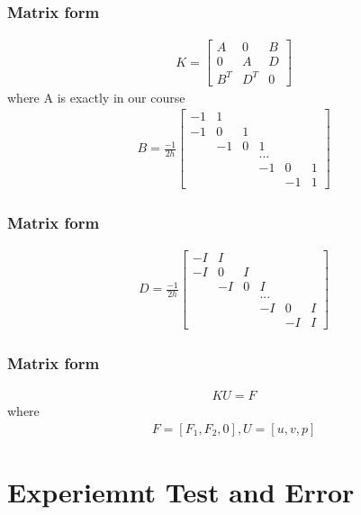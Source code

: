 \documentclass[11pt]{beamer}
\numberwithin{equation}{section}
\theoremstyle{plain}
\theoremstyle{definition}
\theoremstyle{remark}
\begin{document}
\begin{frame}\frametitle{Matrix form}
\begin{align*}
K=\begin{bmatrix}
A & 0 & B\\ 
0 & A & D\\ 
B^T & D^T & 0 
\end{bmatrix}
\end{align*}  
where A is exactly in our course 
\begin{align*}
B=\frac{-1}{2h} \begin{bmatrix}
-1 & 1 &  &  &  & \\ 
-1 & 0 & 1 &  &  & \\ 
 & -1 & 0 & 1 &  & \\ 
 &  &  & ... &  & \\ 
 &  &  & -1 & 0 & 1\\ 
 &  &  &  & -1 & 1
\end{bmatrix}
\end{align*}
\end{frame}

\begin{frame}\frametitle{Matrix form}
\begin{align*}
D=\frac{-1}{2h} \begin{bmatrix}
-I & I &  &  &  & \\ 
-I & 0 & I &  &  & \\ 
 & -I & 0 & I &  & \\ 
 &  &  & ... &  & \\ 
 &  &  & -I & 0 & I\\ 
 &  &  &  & -I & I 
\end{bmatrix}
\end{align*} 
\end{frame}

\begin{frame}\frametitle{Matrix form}
\begin{align*}
KU=F
\end{align*} 
where 
\begin{align*}
F=[F_1, F_2, 0],U=[u,v,p]
\end{align*}

\end{frame}

\section{Experiemnt Test and Error}
\end{document}
